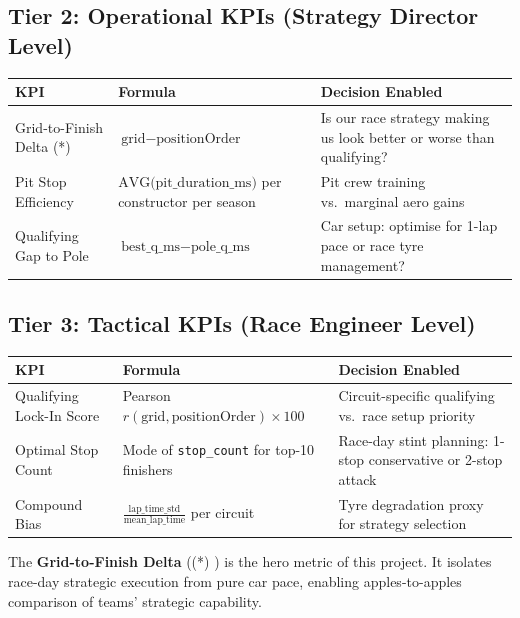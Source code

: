 \documentclass[12pt, a4paper]{article}
\begin{document}
\subsection{Tier 2: Operational KPIs (Strategy Director Level)}

\begin{table}[H]
\centering
\begin{tabularx}{\textwidth}{l l X}
\toprule
\textbf{KPI} & \textbf{Formula} & \textbf{Decision Enabled} \\
\midrule
Grid-to-Finish Delta (*) & $\text{grid} - \text{positionOrder}$ & Is our race strategy making us look better or worse than qualifying? \\[6pt]
Pit Stop Efficiency & $\text{AVG(pit\_duration\_ms)}$ per constructor per season & Pit crew training vs.\ marginal aero gains \\[6pt]
Qualifying Gap to Pole & $\text{best\_q\_ms} - \text{pole\_q\_ms}$ & Car setup: optimise for 1-lap pace or race tyre management? \\
\bottomrule
\end{tabularx}
\end{table}

\subsection{Tier 3: Tactical KPIs (Race Engineer Level)}

\begin{table}[H]
\centering
\begin{tabularx}{\textwidth}{l l X}
\toprule
\textbf{KPI} & \textbf{Formula} & \textbf{Decision Enabled} \\
\midrule
Qualifying Lock-In Score & Pearson $r(\text{grid}, \text{positionOrder}) \times 100$ & Circuit-specific qualifying vs.\ race setup priority \\[6pt]
Optimal Stop Count & Mode of \texttt{stop\_count} for top-10 finishers & Race-day stint planning: 1-stop conservative or 2-stop attack \\[6pt]
Compound Bias & $\frac{\text{lap\_time\_std}}{\text{mean\_lap\_time}}$ per circuit & Tyre degradation proxy for strategy selection \\
\bottomrule
\end{tabularx}
\end{table}

The \textbf{Grid-to-Finish Delta} ((*) ) is the hero metric of this project. It isolates race-day strategic execution from pure car pace, enabling apples-to-apples comparison of teams' strategic capability.
\end{document}
